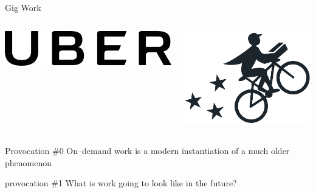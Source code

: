 \documentclass[presentation]{subfiles}
\begin{document}
\begin{frame}
\begin{columns}[b]
      \begin{column}[t]{0.45\textwidth}
        \centering
        Gig Work
        \begin{columns}
          \begin{column}{.5\textwidth}
            \includegraphics[max width=\linewidth,max height=\textheight,keepaspectratio]{../common_figures/uber.png}
          \end{column}
          \begin{column}{.5\textwidth}
            \includegraphics[max width=\linewidth,max height=\textheight,keepaspectratio]{../common_figures/postmates.png}
          \end{column}
        \end{columns}
      \end{column}
    \end{columns}
\end{frame}

\begin{frame}[standout,label=takeaway]{Provocation \#0}
  On--demand work is a modern instantiation of a much older phenomenon

\vspace{2em}

\end{frame}


\begin{frame}[standout]{provocation \#1}
    What is work going to look like in the future?
\end{frame}
\end{document}
